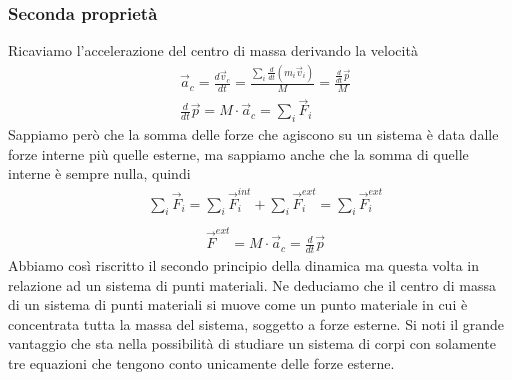 \subsubsection{Seconda proprietà}
Ricaviamo l'accelerazione del centro di massa derivando la velocità
\begin{align*}
&\vec{a}_c = \frac{d\vec{v}_c}{dt}=\frac{\sum_{i}\frac{d}{dt}(m_i \vec{v}_i)}{M}=\frac{\frac{d}{dt}\vec{p}}{M}\\
&\frac{d}{dt}\vec{p} = M \cdot \vec{a}_c = \sum_{i}\vec{F}_i
\end{align*}
Sappiamo però che la somma delle forze che agiscono su un sistema è data dalle forze interne più quelle esterne, ma sappiamo anche che la somma di quelle interne è sempre nulla, quindi
\begin{align*}
&\sum_{i}\vec{F}_i=\sum_{i}\vec{F}^{int}_i+\sum_{i}\vec{F}^{ext}_i=\sum_{i}\vec{F}^{ext}_i\\
\end{align*}
\begin{align}\label{eq:cardinale1}
&\vec{F}^{ext} = M \cdot \vec{a}_c = {\frac{d}{dt}\vec{p}}
\end{align}
Abbiamo così riscritto il secondo principio della dinamica ma questa volta in relazione ad un sistema di punti materiali. Ne deduciamo che il centro di massa di un sistema di punti materiali si muove come un punto materiale in cui è concentrata tutta la massa del sistema, soggetto a forze esterne. Si noti il grande vantaggio che sta nella possibilità di studiare un sistema di corpi con solamente tre equazioni che tengono conto unicamente delle forze esterne. 
